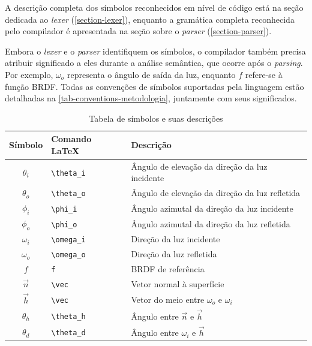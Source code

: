 A descrição completa dos símbolos reconhecidos em nível de código está na seção dedicada ao \textit{lexer} (\autoref{section-lexer}), enquanto a gramática completa reconhecida pelo compilador é apresentada na seção sobre o \textit{parser} (\autoref{section-parser}).

Embora o \textit{lexer} e o \textit{parser} identifiquem os símbolos, o compilador também precisa atribuir significado a eles durante a análise semântica, que ocorre após o \textit{parsing}. Por exemplo, $\omega_o$ representa o ângulo de saída da luz, enquanto $f$ refere-se à função BRDF. Todas as convenções de símbolos suportadas pela linguagem estão detalhadas na \autoref{tab-conventions-metodologia}, juntamente com seus significados.

\begin{table}[h]
    \centering
    \begin{tabular}{cll}
        \hline
        \textbf{Símbolo} &\textbf{Comando \LaTeX{}} & \textbf{Descrição} \\
        \hline
         $\theta_i$ & \verb"\theta_i" &Ângulo de elevação da direção da luz incidente \\ \hline
         $\theta_o$ & \verb"\theta_o" &Ângulo de elevação da direção da luz refletida \\ \hline
         $\phi_i$   & \verb"\phi_i"   &Ângulo azimutal da direção da luz incidente \\ \hline
         $\phi_o$   & \verb"\phi_o"   &Ângulo azimutal da direção da luz refletida \\ \hline
         $\omega_i$ & \verb"\omega_i" &Direção da luz incidente  \\ \hline
         $\omega_o$ & \verb"\omega_o" &Direção da luz refletida  \\ \hline
         $f$        & \verb"f"        &BRDF de referência \\ \hline
         $\vec{n}$  & \verb"\vec"     &Vetor normal à superfície \\ \hline
         $\vec{h}$  & \verb"\vec"     &Vetor do meio entre $\omega_o$ e $\omega_i$ \\ \hline
         $\theta_h$ & \verb"\theta_h" &Ângulo entre $\vec{n}$ e $\vec{h}$ \\ \hline
         $\theta_d$ & \verb"\theta_d" &Ângulo entre $\omega_i$ e $\vec{h}$ \\ \hline
    \end{tabular}
    \caption{Tabela de símbolos e suas descrições}
    \label{tab-conventions-metodologia}
\end{table}
%
%
